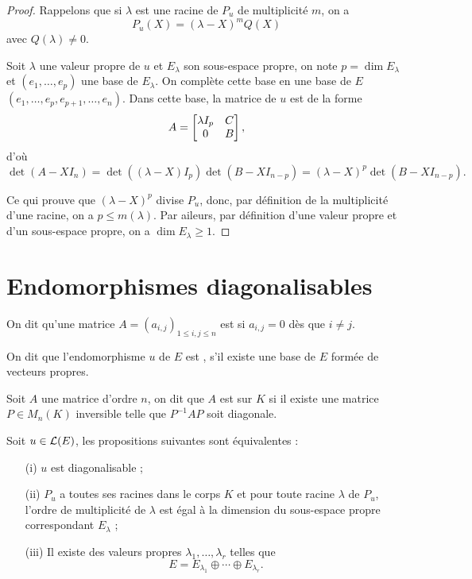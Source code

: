 \documentclass[class=report,crop=false]{standalone}
\begin{document}
\begin{proof}
Rappelons que si $\lambda$ est une racine de $P_u$ de multiplicité $m$, on a 
$$P_u(X)=(\lambda-X)^mQ(X)$$
avec $Q(\lambda)\neq 0$.

Soit $\lambda$ une valeur propre de $u$ et $E_\lambda$ son sous-espace propre, on note $p=\dim E_\lambda$ et $(e_1,\dots,e_p)$ une base de $E_\lambda$. On complète cette base en une base de $E$
$(e_1,\dots,e_p,e_{p+1},\dots,e_n)$.
Dans cette base, la matrice de $u$ est de la forme
$$A=\left[\begin{matrix}\lambda I_p & C\cr 0 & B\end{matrix}\right],$$
d'où
$\det(A-XI_n)=\det((\lambda-X)I_p)\det(B-XI_{n-p})=(\lambda-X)^p\det(B-XI_{n-p}).$

Ce qui prouve que $(\lambda-X)^p$ divise $P_u$, donc, par définition de la multiplicité d'une racine, on a $p\leq m(\lambda)$. Par aileurs, par définition d'une valeur propre et d'un sous-espace propre, on a
$\dim E_\lambda\geq 1$.
\end{proof} 




\section{Endomorphismes diagonalisables}


\begin{definition}
On dit qu'une matrice $A=(a_{i,j})_{1\leq i,j\leq n}$ est  
si $a_{i,j}=0$ dès que $i\neq j$.
\end{definition} 

\begin{definition}
On dit que l'endomorphisme $u$ de $E$ est , 
s'il existe une base de $E$ formée de vecteurs propres.
\end{definition} 


\begin{definition}
Soit $A$ une matrice d'ordre $n$, on dit que $A$ est  
sur $K$ si il existe une matrice $P\in M_n(K)$ inversible telle que $P^{-1}AP$ soit diagonale.
\end{definition} 


\begin{theoreme}
Soit $u\in {\cal L }(E)$, les propositions suivantes sont équivalentes :
\begin{itemize}
  \item[(i)] $u$ est diagonalisable ;
  \item[(ii)] $P_u$ a toutes ses racines dans le corps $K$ et pour toute 
  racine $\lambda$ de $P_u$, l'ordre de multiplicité de $\lambda$ est égal 
  à la dimension du sous-espace propre correspondant $E_\lambda$ ;
  \item[(iii)]  Il existe des valeurs propres $\lambda_1,\dots,\lambda_r$ telles que 
$$E=E_{\lambda_1}\oplus\cdots\oplus E_{\lambda_r}.$$ 
\end{itemize}
\end{theoreme} 
\end{document}

